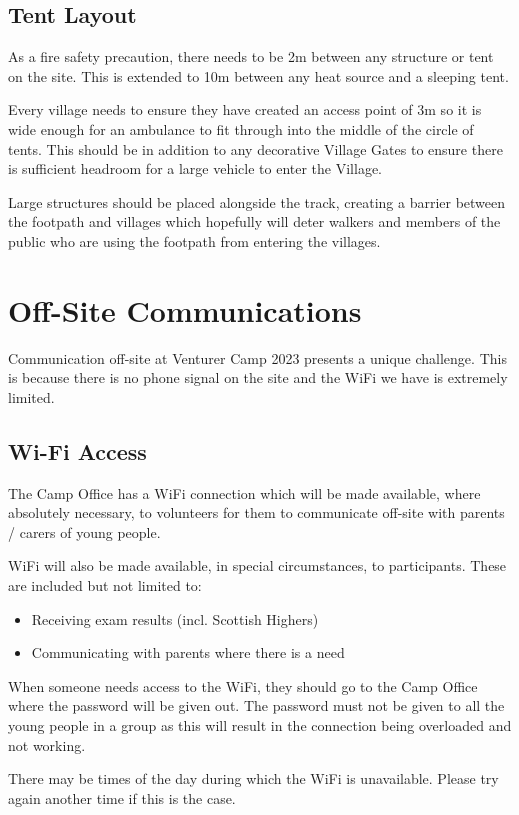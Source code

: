 \documentclass[a4paper, 11pt]{report}
\begin{document}
\section{Tent Layout}
As a fire safety precaution, there needs to be 2m between any structure or tent on the site. This is extended to 10m between any heat source and a sleeping tent. \nl

Every village needs to ensure they have created an access point of 3m so it is wide enough for an ambulance to fit through into the middle of the circle of tents. This should be in addition to any decorative Village Gates to ensure there is sufficient headroom for a large vehicle to enter the Village.  \nl

Large structures should be placed alongside the track, creating a barrier between the footpath and villages which hopefully will deter walkers and members of the public who are using the footpath from entering the villages. 

\chapter{Off-Site Communications}
Communication off-site at Venturer Camp 2023 presents a unique challenge. This is because there is no phone signal on the site and the WiFi we have is extremely limited.
\section{Wi-Fi Access}
The Camp Office has a WiFi connection which will be made available, where absolutely necessary, to volunteers for them to communicate off-site with parents / carers of young people. \nl

WiFi will also be made available, in special circumstances, to participants. These are included but not limited to:
\begin{itemize}
    \item Receiving exam results (incl. Scottish Highers)
    \item Communicating with parents where there is a need
\end{itemize}

When someone needs access to the WiFi, they should go to the Camp Office where the password will be given out. The password must not be given to all the young people in a group as this will result in the connection being overloaded and not working.\nl

There may be times of the day during which the WiFi is unavailable. Please try again another time if this is the case.\nl
\end{document}
